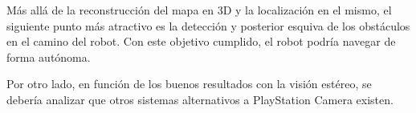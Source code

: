 

Más allá de la reconstrucción del mapa en 3D y la localización en el mismo, el
siguiente punto más atractivo es la detección y posterior esquiva de los
obstáculos en el camino del robot. Con este objetivo cumplido, el robot podría
navegar de forma autónoma.

Por otro lado, en función de los buenos resultados con la visión estéreo, se
debería analizar que otros sistemas alternativos a PlayStation Camera existen.
